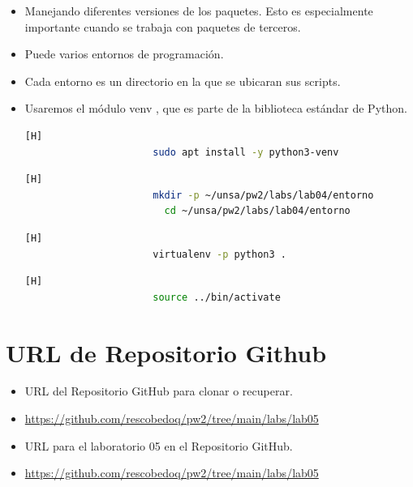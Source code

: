 \documentclass{article}
\begin{document}
\begin{itemize}
\begin{itemize}
\begin{itemize}
                \item Manejando diferentes versiones de los paquetes. Esto es especialmente importante cuando se trabaja con paquetes de terceros.
                \item Puede varios entornos de programación.
                \item Cada entorno es un directorio en la que se ubicaran sus scripts.
                \item Usaremos el módulo venv , que es parte de la biblioteca estándar de Python.
                \begin{lstlisting}[language=bash,caption={Entorno de Linux-Instalemos venv escribiendo:}][H]
    		          sudo apt install -y python3-venv
    	        \end{lstlisting}
                \begin{lstlisting}[language=bash,caption={Entorno de Linux-Para crear un ambiente elija en qué directorio.}][H]
    		          mkdir -p ~/unsa/pw2/labs/lab04/entorno
                        cd ~/unsa/pw2/labs/lab04/entorno
    	        \end{lstlisting}
                \begin{lstlisting}[language=bash,caption={Entorno de Linux-En el directorio crea un entorno virtual ejecutando el siguiente comando:}][H]
    		          virtualenv -p python3 .
    	        \end{lstlisting}
                \begin{lstlisting}[language=bash,caption={Entorno de Linux-Ejecute el script de activación para activar el entorno virtual:}][H]
    		          source ../bin/activate
    	        \end{lstlisting}
            \end{itemize}
        \end{itemize}
	\end{itemize}
	
	\section{URL de Repositorio Github}
	\begin{itemize}
		\item URL del Repositorio GitHub para clonar o recuperar.
		\item \url{https://github.com/rescobedoq/pw2/tree/main/labs/lab05}
		\item URL para el laboratorio 05 en el Repositorio GitHub.
		\item \url{https://github.com/rescobedoq/pw2/tree/main/labs/lab05}
	\end{itemize}
	
\end{document}
